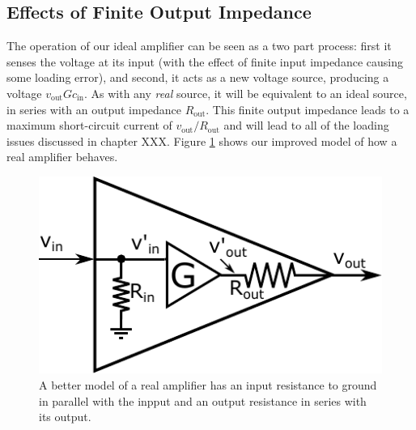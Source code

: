 \documentclass[]{article}
\begin{document}
\subsection{Effects of Finite Output Impedance}
The operation of our ideal amplifier can be seen as a two part process: first it senses the voltage at its input (with the effect of finite input impedance causing some loading error), and second, it acts as a new voltage source, producing a voltage $v_\text{out} Gc_\text{in}$. As with any \textit{real} source, it will be equivalent to an ideal source, in series with an output impedance $R_\text{out}$. This finite output impedance leads to a maximum short-circuit current of $v_\text{out}/R_\text{out}$ and will lead to all of the loading issues discussed in chapter XXX. Figure \ref{fig:real_amp_int_out} shows our improved model of how a real amplifier behaves.
\begin{figure}[h]
\caption{A better model of a real amplifier has an input resistance to ground in parallel with the inpput and an output resistance in series with its output.}
\label{fig:real_amp_int_out}
\begin{center}
\includegraphics{Images/RealAmplifier_int_out.pdf}
\end{center}
\end{figure}
\end{document}

